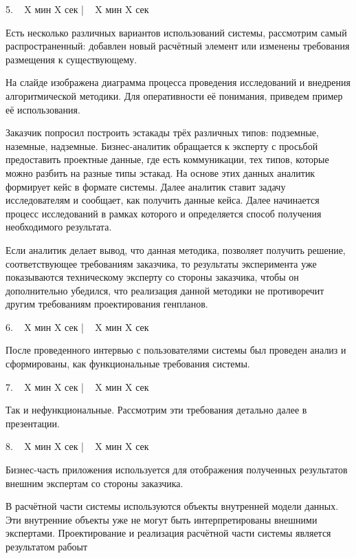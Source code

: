 \documentclass[a4paper,14pt]{extarticle}
\begin{document}
    5. ~ X мин X сек | ~ X мин X сек

    Есть несколько различных вариантов использований системы, рассмотрим самый распространенный:
    добавлен новый расчётный элемент или изменены требования размещения к существующему.

    На слайде изображена диаграмма процесса проведения исследований и
    внедрения алгоритмической методики. Для оперативности её понимания, приведем пример её использования.

    Заказчик попросил построить эстакады трёх различных типов: подземные, наземные, надземные.
    Бизнес-аналитик обращается к эксперту с просьбой предоставить проектные данные, где есть коммуникации,
    тех типов, которые можно разбить на разные типы эстакад.
    На основе этих данных аналитик формирует кейс в формате системы.
    Далее аналитик ставит задачу исследователям и сообщает, как получить данные кейса.
    Далее начинается процесс исследований в рамках которого и определяется способ получения необходимого результата.

    Если аналитик делает вывод, что данная методика, позволяет получить решение, соответствующее требованиям
    заказчика, то результаты эксперимента уже показываются техническому эксперту со стороны заказчика,
    чтобы он дополнительно убедился, что реализация данной методики не противоречит другим требованиям
    проектирования генпланов.

    6. ~ X мин X сек | ~ X мин X сек

    После проведенного интервью с пользователями системы был проведен анализ и сформированы,
    как функциональные требования системы.

    7. ~ X мин X сек | ~ X мин X сек

    Так и нефункциональные.
    Рассмотрим эти требования детально далее в презентации.

    8. ~ X мин X сек | ~ X мин X сек

    Бизнес-часть приложения используется для отображения полученных результатов внешним экспертам со стороны заказчика.

    В расчётной части системы используются объекты внутренней модели данных.
    Эти внутренние объекты уже не могут быть интерпретированы внешними экспертами.
    Проектирование и реализация расчётной части системы является результатом рабоыт
\end{document}
